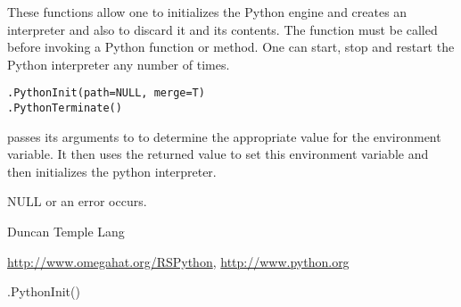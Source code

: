 \begin{Description}\relax
These functions allow one to initializes the Python engine and creates an interpreter
and also to discard it and its contents.
The  function  must be called before invoking a Python function or method.
One can start, stop and restart the Python interpreter any number of times.\end{Description}
\begin{Usage}
\begin{verbatim}
.PythonInit(path=NULL, merge=T)
.PythonTerminate()
\end{verbatim}
\end{Usage}
\begin{Details}\relax
{} passes its arguments
to  to determine the
appropriate value for the  environment
variable. It then uses the returned value to set
this environment variable and then initializes the python
interpreter.\end{Details}
\begin{Value}
NULL or an error occurs.\end{Value}
\begin{Author}\relax
Duncan Temple Lang\end{Author}
\begin{References}\relax
\url{http://www.omegahat.org/RSPython},
\url{http://www.python.org}\end{References}
\begin{SeeAlso}\relax
{}\end{SeeAlso}
\begin{Examples}
\begin{ExampleCode}

  .PythonInit()

\end{ExampleCode}
\end{Examples}

